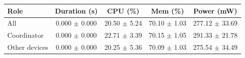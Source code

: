 \begin{tabular}{lcccc}
\hline
\textbf{Role} & \textbf{Duration (s)} & \textbf{CPU (\%)} & \textbf{Mem (\%)} & \textbf{Power (mW)} \\
\hline
All & 0.000 $\pm$ 0.000 & 20.50 $\pm$ 5.24 & 70.10 $\pm$ 1.03 & 277.12 $\pm$ 33.69 \\
Coordinator & 0.000 $\pm$ 0.000 & 22.71 $\pm$ 3.39 & 70.15 $\pm$ 1.05 & 291.33 $\pm$ 21.78 \\
Other devices & 0.000 $\pm$ 0.000 & 20.25 $\pm$ 5.36 & 70.09 $\pm$ 1.03 & 275.54 $\pm$ 34.49 \\
\hline
\end{tabular}
